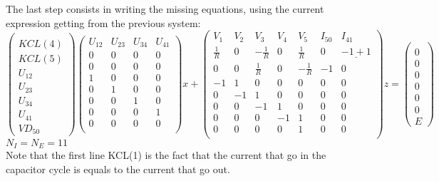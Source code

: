 The last step consists in writing the missing equations, using the current expression getting from the
 previous system:
 \[\left(\begin{array}{c}
  \\
KCL(4)\\KCL(5)\\U_{12}\\U_{23}\\U_{34}\\U_{41}\\VD_{50}
\end{array}\right)
 \left(\begin{array}{cccc}
  U_{12}&U_{23}&U_{34}&U_{41}\\
  \hline
  0&0&0&0\\
  0&0&0&0\\
  1&0&0&0\\
  0&1&0&0\\
  0&0&1&0\\
  0&0&0&1\\
  0&0&0&0\\

\end{array}\right)x+
 \left(\begin{array}{ccccccc}
  V_{1}&V_{2}&V_{3}&V_{4}&V_{5}&I_{50}&I_{41}\\
  \hline
  \frac{1}{R}&0&-\frac{1}{R}&0&\frac{1}{R}&0&\underline{-1+1}\\
  0&0&\frac{1}{R}&0&-\frac{1}{R}&-1&0\\
  -1&1&0&0&0&0&0\\
  0&-1&1&0&0&0&0\\
  0&0&-1&1&0&0&0\\
  0&0&0&-1&1&0&0\\
  0&0&0&0&1&0&0\\
\end{array}\right)z=
 \left(\begin{array}{c}
  \\0\\0\\0\\0\\0\\0\\E
\end{array}\right)
 \]
$N_{I}=N_{E}=11$\\
Note that the first line KCL(1) is the fact that the current that
go in the capacitor cycle is equals to the current that go out.
